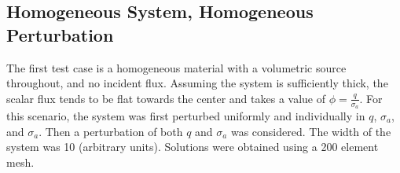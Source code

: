 \documentclass[12pt]{report}
\begin{document}
\subsection{Homogeneous System, Homogeneous Perturbation}
The first test case is a homogeneous material with a volumetric source throughout, and no incident flux. Assuming the system is sufficiently thick, the scalar flux tends to be flat towards the center and takes a value of $\phi=\frac{q}{\sigma_a}$. For this scenario, the system was first perturbed uniformly and individually in $q$, $\sigma_a$, and $\sigma_a$. Then a perturbation of both $q$ and $\sigma_a$ was considered. The width of the system was 10 (arbitrary units). Solutions were obtained using a 200 element mesh.
\end{document}
